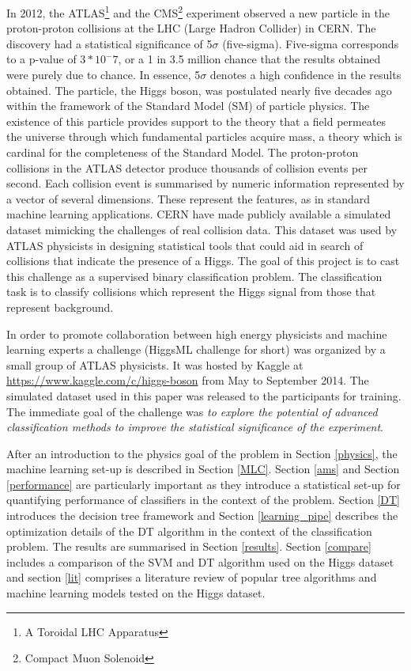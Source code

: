 \documentclass[final,3p,times,twocolumn]{elsarticle}
\begin{document}
In 2012, the ATLAS\footnote{A Toroidal LHC Apparatus} and the CMS\footnote{Compact Muon Solenoid} experiment observed a new particle in the proton-proton collisions at the LHC (Large Hadron Collider) in CERN. The discovery had a statistical significance of 5$\sigma$ (five-sigma). Five-sigma corresponds to a p-value of $3*10^-7$, or a 1 in 3.5 million chance that the results obtained were purely due to chance. In essence, 5$\sigma$ denotes a high confidence in the results obtained. The particle, the Higgs boson, was postulated nearly five decades ago within the framework of the Standard Model (SM) of particle physics. The existence of this particle provides support to the theory that a field permeates the universe through which fundamental particles acquire mass, a theory which is cardinal for the completeness of the Standard Model. The proton-proton collisions in the ATLAS detector produce thousands of collision events per second. Each collision event is summarised by numeric information represented by a vector of several dimensions. These represent the features, as in standard machine learning applications. CERN have made publicly available a simulated dataset  mimicking the challenges of real collision data. This dataset was used by ATLAS physicists in designing statistical tools that could aid in search of collisions that indicate the presence of a Higgs. The goal of this project is to cast this challenge as a supervised binary classification problem. The classification task is to classify collisions which represent the Higgs signal from those that represent background. 

In order to promote collaboration between high energy physicists and machine learning experts a challenge (HiggsML challenge for short) was organized by a small group of ATLAS physicists. It was hosted by Kaggle at  
\url{https://www.kaggle.com/c/higgs-boson} from May to September 2014. The simulated dataset used in this paper was released to the participants for training. The immediate goal of the challenge was \textit{to explore the potential of advanced classification methods to improve the statistical significance of the experiment}\cite{RM}. 

After an introduction to the physics goal of the problem in Section \ref{physics}, the machine learning set-up is described in Section \ref{MLC}. Section \ref{ams} and Section \ref{performance} are particularly important as they introduce a  statistical set-up for quantifying performance of classifiers in the context of the problem. Section \ref{DT} introduces the decision tree framework and Section \ref{learning_pipe} describes the optimization details of the DT algorithm in the context of the classification problem. The results are summarised in Section \ref{results}. Section \ref{compare} includes a comparison of the SVM and DT algorithm used on the Higgs dataset and section \ref{lit} comprises a literature review of popular tree algorithms and machine learning models tested on the Higgs dataset.   
\end{document}
